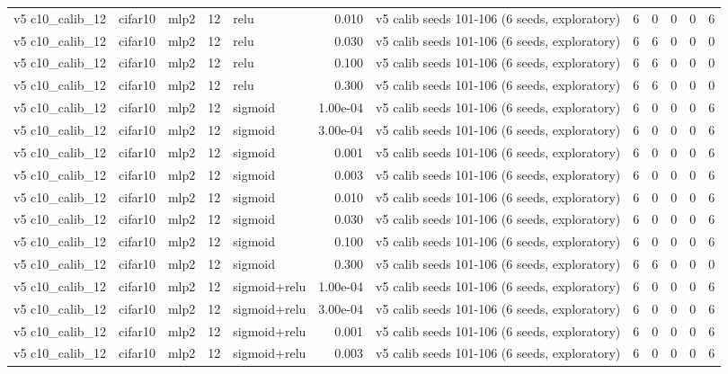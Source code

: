 \begin{table}[htbp]
{\begin{tabular}{@{}lllrlrlrrrrr@{}}
v5 c10\_calib\_12 & cifar10 & mlp2 & 12 & relu & 0.010 & v5 calib seeds 101-106 (6 seeds, exploratory) & 6 & 0 & 0 & 0 & 6 \\
v5 c10\_calib\_12 & cifar10 & mlp2 & 12 & relu & 0.030 & v5 calib seeds 101-106 (6 seeds, exploratory) & 6 & 6 & 0 & 0 & 0 \\
v5 c10\_calib\_12 & cifar10 & mlp2 & 12 & relu & 0.100 & v5 calib seeds 101-106 (6 seeds, exploratory) & 6 & 6 & 0 & 0 & 0 \\
v5 c10\_calib\_12 & cifar10 & mlp2 & 12 & relu & 0.300 & v5 calib seeds 101-106 (6 seeds, exploratory) & 6 & 6 & 0 & 0 & 0 \\
v5 c10\_calib\_12 & cifar10 & mlp2 & 12 & sigmoid & 1.00e-04 & v5 calib seeds 101-106 (6 seeds, exploratory) & 6 & 0 & 0 & 0 & 6 \\
v5 c10\_calib\_12 & cifar10 & mlp2 & 12 & sigmoid & 3.00e-04 & v5 calib seeds 101-106 (6 seeds, exploratory) & 6 & 0 & 0 & 0 & 6 \\
v5 c10\_calib\_12 & cifar10 & mlp2 & 12 & sigmoid & 0.001 & v5 calib seeds 101-106 (6 seeds, exploratory) & 6 & 0 & 0 & 0 & 6 \\
v5 c10\_calib\_12 & cifar10 & mlp2 & 12 & sigmoid & 0.003 & v5 calib seeds 101-106 (6 seeds, exploratory) & 6 & 0 & 0 & 0 & 6 \\
v5 c10\_calib\_12 & cifar10 & mlp2 & 12 & sigmoid & 0.010 & v5 calib seeds 101-106 (6 seeds, exploratory) & 6 & 0 & 0 & 0 & 6 \\
v5 c10\_calib\_12 & cifar10 & mlp2 & 12 & sigmoid & 0.030 & v5 calib seeds 101-106 (6 seeds, exploratory) & 6 & 0 & 0 & 0 & 6 \\
v5 c10\_calib\_12 & cifar10 & mlp2 & 12 & sigmoid & 0.100 & v5 calib seeds 101-106 (6 seeds, exploratory) & 6 & 0 & 0 & 0 & 6 \\
v5 c10\_calib\_12 & cifar10 & mlp2 & 12 & sigmoid & 0.300 & v5 calib seeds 101-106 (6 seeds, exploratory) & 6 & 6 & 0 & 0 & 0 \\
v5 c10\_calib\_12 & cifar10 & mlp2 & 12 & sigmoid+relu & 1.00e-04 & v5 calib seeds 101-106 (6 seeds, exploratory) & 6 & 0 & 0 & 0 & 6 \\
v5 c10\_calib\_12 & cifar10 & mlp2 & 12 & sigmoid+relu & 3.00e-04 & v5 calib seeds 101-106 (6 seeds, exploratory) & 6 & 0 & 0 & 0 & 6 \\
v5 c10\_calib\_12 & cifar10 & mlp2 & 12 & sigmoid+relu & 0.001 & v5 calib seeds 101-106 (6 seeds, exploratory) & 6 & 0 & 0 & 0 & 6 \\
v5 c10\_calib\_12 & cifar10 & mlp2 & 12 & sigmoid+relu & 0.003 & v5 calib seeds 101-106 (6 seeds, exploratory) & 6 & 0 & 0 & 0 & 6 \\

\end{tabular}}
\end{table}
